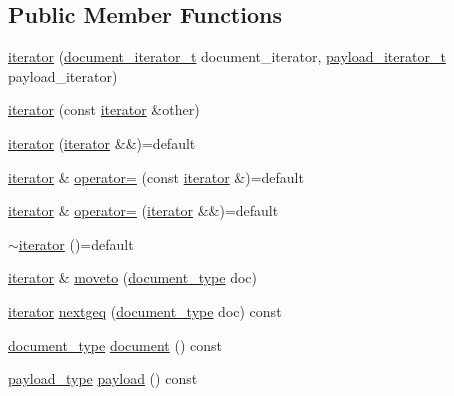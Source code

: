 \subsection*{Public Member Functions}
\begin{DoxyCompactItemize}
\item 
\mbox{\hyperlink{classirk_1_1posting__list__view_1_1iterator_a0735df34097a1113f0295d27791f985d}{iterator}} (\mbox{\hyperlink{classirk_1_1posting__list__view_abaca622760e6da2c67d55cf35207250f}{document\+\_\+iterator\+\_\+t}} document\+\_\+iterator, \mbox{\hyperlink{classirk_1_1posting__list__view_a5a153169348a164ea2cb1a18dc76e279}{payload\+\_\+iterator\+\_\+t}} payload\+\_\+iterator)
\item 
\mbox{\hyperlink{classirk_1_1posting__list__view_1_1iterator_aa4053b60f98871ed18bf6bfb87dfdd18}{iterator}} (const \mbox{\hyperlink{classirk_1_1posting__list__view_1_1iterator}{iterator}} \&other)
\item 
\mbox{\hyperlink{classirk_1_1posting__list__view_1_1iterator_ac5ab4fb266fdc3a6a4ab8557f10e80db}{iterator}} (\mbox{\hyperlink{classirk_1_1posting__list__view_1_1iterator}{iterator}} \&\&)=default
\item 
\mbox{\hyperlink{classirk_1_1posting__list__view_1_1iterator}{iterator}} \& \mbox{\hyperlink{classirk_1_1posting__list__view_1_1iterator_acf1e7434a45368f951fbd378c3b7afaf}{operator=}} (const \mbox{\hyperlink{classirk_1_1posting__list__view_1_1iterator}{iterator}} \&)=default
\item 
\mbox{\hyperlink{classirk_1_1posting__list__view_1_1iterator}{iterator}} \& \mbox{\hyperlink{classirk_1_1posting__list__view_1_1iterator_a1ce474d690d32fc51906fa044bcea967}{operator=}} (\mbox{\hyperlink{classirk_1_1posting__list__view_1_1iterator}{iterator}} \&\&)=default
\item 
\mbox{\hyperlink{classirk_1_1posting__list__view_1_1iterator_ace51d57fb7cb7c97433512a4f366f4cb}{$\sim$iterator}} ()=default
\item 
\mbox{\hyperlink{classirk_1_1posting__list__view_1_1iterator}{iterator}} \& \mbox{\hyperlink{classirk_1_1posting__list__view_1_1iterator_a2f70673e696d84d36854a359b749cd49}{moveto}} (\mbox{\hyperlink{classirk_1_1posting__list__view_ac4615e6e3d8ee1eb9a847b7a34919977}{document\+\_\+type}} doc)
\item 
\mbox{\hyperlink{classirk_1_1posting__list__view_1_1iterator}{iterator}} \mbox{\hyperlink{classirk_1_1posting__list__view_1_1iterator_ac86c0cfbfa10ffc60fcde9a1af51bbc3}{nextgeq}} (\mbox{\hyperlink{classirk_1_1posting__list__view_ac4615e6e3d8ee1eb9a847b7a34919977}{document\+\_\+type}} doc) const
\item 
\mbox{\hyperlink{classirk_1_1posting__list__view_ac4615e6e3d8ee1eb9a847b7a34919977}{document\+\_\+type}} \mbox{\hyperlink{classirk_1_1posting__list__view_1_1iterator_a387b3e383f67002a7712c5d14daf750a}{document}} () const
\item 
\mbox{\hyperlink{classirk_1_1posting__list__view_a1c394061061a8eeeab98cb228f6cdde9}{payload\+\_\+type}} \mbox{\hyperlink{classirk_1_1posting__list__view_1_1iterator_ae7ecff2bd65f5f029446892416ed8c68}{payload}} () const
\end{DoxyCompactItemize}
